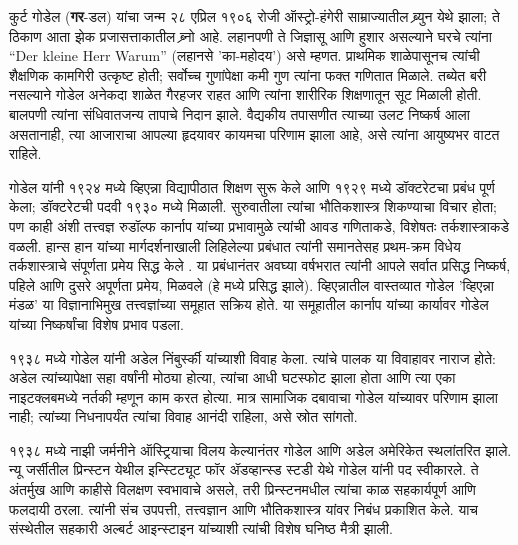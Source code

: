 \documentclass[../../../include/open-logic-section]{subfiles}
\begin{document}



कुर्ट गोडेल (\textbf{गर}-डल) यांचा जन्म २८ एप्रिल १९०६ रोजी ऑस्ट्रो-हंगेरी साम्राज्यातील ब्र्युन येथे झाला; ते ठिकाण आता झेक प्रजासत्ताकातील ब्र्नो आहे. लहानपणी ते जिज्ञासू आणि हुशार असल्याने घरचे त्यांना “Der kleine Herr Warum” (लहानसे 'का-महोदय') असे म्हणत. प्राथमिक शाळेपासूनच त्यांची शैक्षणिक कामगिरी उत्कृष्ट होती; सर्वोच्च गुणांपेक्षा कमी गुण त्यांना फक्त गणितात मिळाले. तब्येत बरी नसल्याने गोडेल अनेकदा शाळेत गैरहजर राहत आणि त्यांना शारीरिक शिक्षणातून सूट मिळाली होती. बालपणी त्यांना संधिवातजन्य तापाचे निदान झाले. वैद्यकीय तपासणीत त्याच्या उलट निष्कर्ष आला असतानाही, त्या आजाराचा आपल्या हृदयावर कायमचा परिणाम झाला आहे, असे त्यांना आयुष्यभर वाटत राहिले.

गोडेल यांनी १९२४ मध्ये व्हिएन्ना विद्यापीठात शिक्षण सुरू केले आणि १९२९ मध्ये डॉक्टरेटचा प्रबंध पूर्ण केला; डॉक्टरेटची पदवी १९३० मध्ये मिळाली. सुरुवातीला त्यांचा भौतिकशास्त्र शिकण्याचा विचार होता; पण काही अंशी तत्त्वज्ञ रुडॉल्फ कार्नाप यांच्या प्रभावामुळे त्यांची आवड गणिताकडे, विशेषतः तर्कशास्त्राकडे वळली. हान्स हान यांच्या मार्गदर्शनाखाली लिहिलेल्या प्रबंधात त्यांनी समानतेसह प्रथम-क्रम विधेय तर्कशास्त्राचे संपूर्णता प्रमेय सिद्ध केले \citep{Godel1929}. या प्रबंधानंतर अवघ्या वर्षभरात त्यांनी आपले सर्वात प्रसिद्ध निष्कर्ष, पहिले आणि दुसरे अपूर्णता प्रमेय, मिळवले (हे \citealt{Godel1931} मध्ये प्रसिद्ध झाले). व्हिएन्नातील वास्तव्यात गोडेल 'व्हिएन्ना मंडळ' या विज्ञानाभिमुख तत्त्वज्ञांच्या समूहात सक्रिय होते. या समूहातील कार्नाप यांच्या कार्यावर गोडेल यांच्या निष्कर्षांचा विशेष प्रभाव पडला.

१९३८ मध्ये गोडेल यांनी अडेल निंबुर्स्की यांच्याशी विवाह केला. त्यांचे पालक या विवाहावर नाराज होते: अडेल त्यांच्यापेक्षा सहा वर्षांनी मोठ्या होत्या, त्यांचा आधी घटस्फोट झाला होता आणि त्या एका नाइटक्लबमध्ये नर्तकी म्हणून काम करत होत्या. मात्र सामाजिक दबावाचा गोडेल यांच्यावर परिणाम झाला नाही; त्यांच्या निधनापर्यंत त्यांचा विवाह आनंदी राहिला, असे स्रोत सांगतो.

१९३८ मध्ये नाझी जर्मनीने ऑस्ट्रियाचा विलय केल्यानंतर गोडेल आणि अडेल अमेरिकेत स्थलांतरित झाले. न्यू जर्सीतील प्रिन्स्टन येथील इन्स्टिट्यूट फॉर ॲडव्हान्स्ड स्टडी येथे गोडेल यांनी पद स्वीकारले. ते अंतर्मुख आणि काहीसे विलक्षण स्वभावाचे असले, तरी प्रिन्स्टनमधील त्यांचा काळ सहकार्यपूर्ण आणि फलदायी ठरला. त्यांनी संच उपपत्ती, तत्त्वज्ञान आणि भौतिकशास्त्र यांवर निबंध प्रकाशित केले. याच संस्थेतील सहकारी अल्बर्ट आइन्स्टाइन यांच्याशी त्यांची विशेष घनिष्ठ मैत्री झाली.
\end{document}
